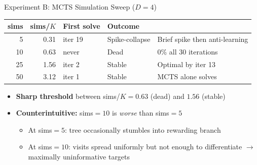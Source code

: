 \documentclass[aspectratio=169, 10pt]{beamer}
\begin{document}
\begin{frame}{Experiment B: MCTS Simulation Sweep ($D{=}4$)}

\centering
\begin{tabular}{rrllp{4.5cm}}
\toprule
sims & sims/$K$ & First solve & Outcome & \\
\midrule
  5 & 0.31 & iter 19     & \textcolor{fragile}{Spike-collapse} & Brief spike then anti-learning \\
 10 & 0.63 & never       & \textcolor{failure}{Dead}            & 0\% all 30 iterations \\
 25 & 1.56 & iter 2      & \textcolor{success}{Stable}          & Optimal by iter 13 \\
 50 & 3.12 & iter 1      & \textcolor{success}{Stable}          & MCTS alone solves \\
\bottomrule
\end{tabular}

\vspace{0.5cm}
\begin{itemize}
  \item \textbf{Sharp threshold} between sims/$K = 0.63$ (dead) and $1.56$ (stable)
  \item \textbf{Counterintuitive:} sims$=10$ is \emph{worse} than sims$=5$
    \begin{itemize}
      \item[\scriptsize$\bullet$] {\small At sims$=5$: tree occasionally stumbles into rewarding branch}
      \item[\scriptsize$\bullet$] {\small At sims$=10$: visits spread uniformly but not enough to differentiate $\to$ maximally uninformative targets}
    \end{itemize}
\end{itemize}
\end{frame}
\end{document}
